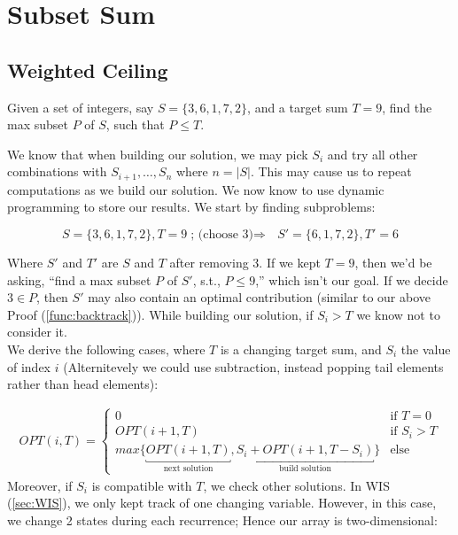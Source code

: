 \newpage
\section{Subset Sum}
\subsection{Weighted Ceiling}


\begin{Def}

Given a set of integers, say $S=\{3,6,1,7,2\}$, and a target sum $T=9$, find the max subset $P$ of $S$, such that $P\leq T$.
\end{Def}

\noindent
We know that when building our solution, we may pick $S_i$ and try all other combinations with $S_{i+1},\dots,S_n$ where $n=|S|$.
This may cause us to repeat computations as we build our solution. We now know to use dynamic programming to store our results. We
start by finding subproblems:

\[
    S=\{3,6,1,7,2\}, T=9 \text{; (choose 3)$\Rightarrow$ } S'=\{6,1,7,2\}, T'=6
\]

\noindent
Where $S'$ and $T'$ are $S$ and $T$ after removing 3. If we kept $T=9$, then we'd be asking, ``find a max subset $P$ of $S'$, s.t., $P\leq 9$,'' which
isn't our goal. If we decide $3\in P$, then $S'$ may also contain an optimal contribution (similar to our above Proof (\ref{func:backtrack})). While
building our solution, if $S_i>T$ we know not to consider it.\\

\noindent
We derive the following cases, where $T$ is a changing target sum, and $S_i$ the value of index $i$  (Alternitevely we could use subtraction, instead popping tail elements rather than head elements):

\vspace{-1em}
\begin{align*}
    OPT(i, T) =
    \begin{cases}
        0 & \text{if $T=0$}\\
        OPT(i+1, T) & \text{if $S_i > T$}\\
        max\{\underbracket{OPT(i+1, T)}_{\text{next solution}}, \underbracket{S_i+OPT(i+1, T-S_i)}_{\text{build solution}}\} & \text{else}
    \end{cases}
\end{align*}
\noindent
Moreover, if $S_i$ is compatible with $T$, we check other solutions.
In WIS (\ref{sec:WIS}), we only kept track of one changing variable.
However, in this case, we change 2 states during each recurrence; 
Hence our array is two-dimensional:

